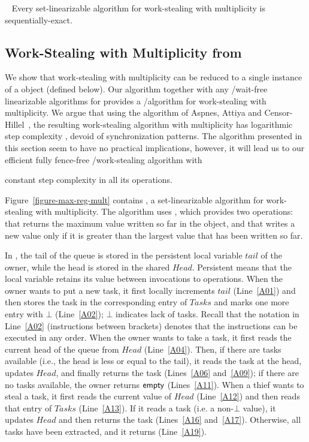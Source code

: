 \begin{remark}~\label{remark-seq-exact-set-lin}
Every set-linearizable algorithm for work-stealing with multiplicity is sequentially-exact.
\end{remark}

\subsection{\label{sec-ws-mult-max-reg}Work-Stealing with Multiplicity from \MaxReg}


We show that work-stealing with multiplicity can be reduced to a single instance of a \MaxReg object (defined below).  Our algorithm together with any \R/\W wait-free linearizable algorithms for \MaxReg provides a \R/\W algorithm for work-stealing with multiplicity.  We argue that using the \MaxReg algorithm of Aspnes, Attiya and Censor-Hillel~\cite{DBLP_journals_jacm_AspnesAC12}, the resulting work-stealing algorithm with multiplicity has logarithmic step complexity , devoid of \RAW synchronization patterns. The algorithm presented in this section seem to have no practical implications, however, it will lead us to our efficient fully fence-free \R/\W work-stealing algorithm with

constant step complexity in all its operations.

Figure~\ref{figure-max-reg-mult} contains \WFWSM, a set-linearizable algorithm for work-stealing with multiplicity. The algorithm uses , which provides two operations: \MaxR that returns the maximum value written so far in the object, and \MaxW that writes a new value only if it is greater than the largest value that has been written so far.


In \WFWSM, the tail of the queue is stored in the persistent local variable \(tail\) of the owner, while the head is stored in the shared \MaxReg \(Head\). Persistent means that the local variable retains its value between invocations to operations. When the owner wants to put a new task, it first locally increments \(tail\) (Line~\ref{A01}) and then stores the task in the corresponding entry of \(Tasks\) and marks one more entry with \(\bot\) (Line~\ref{A02}); \(\bot\) indicates lack of tasks.  Recall that the notation in Line~\ref{A02} (instructions between brackets) denotes that the instructions can be executed in any order.  When the owner wants to take a task, it first reads the current head of the queue from \(Head\) (Line~\ref{A04}). Then, if there are tasks available (i.e., the head is less or equal to the tail), it reads the task at the head, updates \(Head\), and finally returns the task (Lines~\ref{A06} and~\ref{A09}); if there are no tasks available, the owner returns ${\sf \small empty}$ (Lines~\ref{A11}).  When a thief wants to steal a task, it first reads the current value of \(Head\) (Line~\ref{A12}) and then reads that entry of \(Tasks\) (Line~\ref{A13}).  If it reads a task (i.e. a non-\(\bot\) value), it updates \(Head\) and then returns the task (Lines~\ref{A16} and~\ref{A17}).  Otherwise, all tasks have been extracted, and it returns \epty (Line~\ref{A19}).

